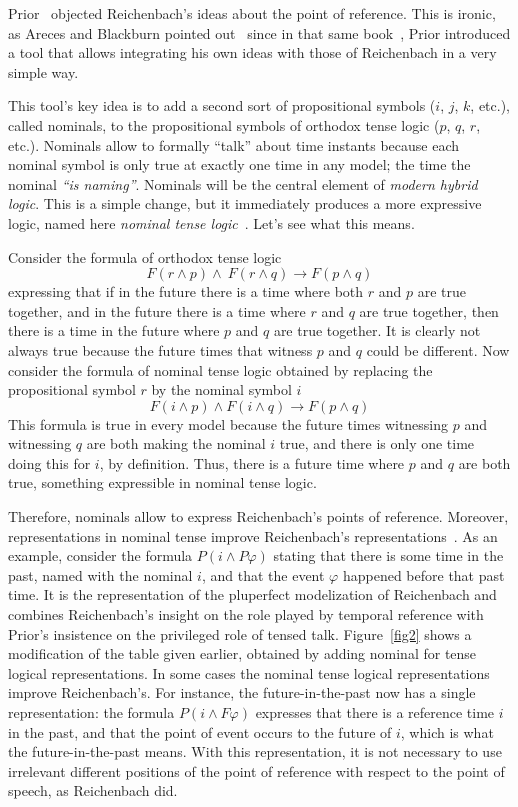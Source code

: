  Prior~\cite{Prior1967} objected Reichenbach's ideas about the point of
reference. This is ironic, as Areces and Blackburn pointed 
out~\cite{ArecesBlackburn2005} since in that same book~\cite{Prior1967}, Prior introduced
a tool that allows integrating his own ideas with those of Reichenbach in a
very simple way.

This tool's key idea is to add a second sort of propositional symbols ($i$, $%
j$, $k$, etc.), called nominals, to the propositional symbols of orthodox
tense logic ($p$, $q$, $r$, etc.). Nominals allow to formally ``talk'' about
time instants because each nominal symbol is only true at exactly one time in any
model; the time the nominal \emph{``is naming''}. Nominals will be the central
element of \emph{modern hybrid logic}. This is a simple change, but it
immediately produces a more expressive logic, named here \emph{nominal tense
logic}~\cite{Blackburn1994}. Let's see what this means.

Consider the formula of orthodox tense logic
$$
F(r\wedge p)\wedge \ F(r\wedge q)\rightarrow F(p\wedge q)
$$
expressing that if in the future there is a time where both $r$ and $p$ are
true together, and in the future there is a time where $r$ and $q$ are true
together, then there is a time in the future where $p$ and $q$ are true
together. It is clearly not always true because the future times that
witness $p$ and $q$ could be different. Now consider the formula of nominal
tense logic obtained by replacing the propositional symbol $r$ by the nominal
symbol $i$ 
$$
F(i\wedge p)\wedge F(i\wedge q)\rightarrow F(p\wedge q)
$$
This formula is true in every model because the future times witnessing $p$
and witnessing $q$ are both making the nominal $i$ true, and there is only
one time doing this for $i$, by definition. Thus, there is a future time
where $p$ and $q$ are both true, something expressible in nominal tense
logic.

Therefore, nominals allow to express Reichenbach's
points of reference. Moreover, representations in nominal tense improve
Reichenbach's representations~\cite{ArecesBlackburn2005}. As an example,
consider the formula $P(i\wedge P\varphi )$ stating that there is some time
in the past, named with the nominal $i$, and that the event $\varphi $
happened before that past time. It is the representation of the pluperfect
modelization of Reichenbach and combines Reichenbach's insight on the role
played by temporal reference with Prior's insistence on the privileged role
of tensed talk. Figure~\ref{fig2} shows a modification of the table given earlier,
obtained by adding nominal for tense logical representations. In some cases
the nominal tense logical representations improve Reichenbach's. For
instance, the future-in-the-past now has a single representation: the
formula $P(i\wedge F\varphi )$ expresses that there is a reference time $i$
in the past, and that the point of event occurs to the future of $i$, which
is what the future-in-the-past means. With this representation, it is not
necessary to use irrelevant different positions of the point of reference
with respect to the point of speech, as Reichenbach did.

